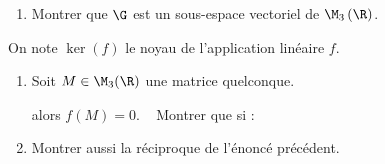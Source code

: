 \documentclass[12pt]{article}
\begin{document}
\begin{enumerate}[resume]
  \begin{enumerate}
    \item Montrer que \(\G\) est un sous-espace vectoriel de \(\M_{3}\left( \R\right) \).
  \end{enumerate}
On note \(\ker(f)\) le noyau de l'application linéaire \(f\). 
  \begin{enumerate}[resume]
    \item Soit $M \in \M_{3}(\R)$ une matrice quelconque.

      \begin{objetGauche}
        alors $f(M) = 0$. \hspace{3cm}~
        \finObjet
      Montrer que si : \quad
      \end{objetGauche}
      \moinsLigne[2]
    \item Montrer aussi la réciproque de l'énoncé précédent. 


\end{enumerate}
\end{enumerate}
\end{document}
